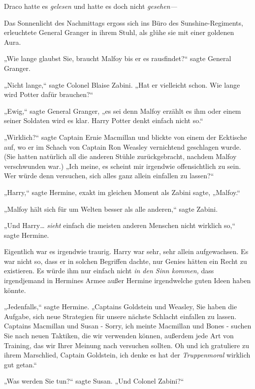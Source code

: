{Draco hatte es \emph{gelesen} und hatte es doch nicht \emph{gesehen—}

\later

Das Sonnenlicht des Nachmittags ergoss sich ins Büro des Sunshine-Regiments, erleuchtete General Granger in ihrem Stuhl, als glühe sie mit einer goldenen Aura.

„Wie lange glaubst Sie, braucht Malfoy bis er es rausfindet?“ sagte General Granger.

„Nicht lange,“ sagte Colonel Blaise Zabini. „Hat er vielleicht schon. Wie lange wird Potter dafür brauchen?“

„Ewig,“ sagte General Granger, „es sei denn Malfoy erzählt es ihm oder einem seiner Soldaten wird es klar. Harry Potter denkt einfach nicht so.“

„Wirklich?“ sagte Captain Ernie Macmillan und blickte von einem der Ecktische auf, wo er im Schach von Captain Ron Weasley vernichtend geschlagen wurde. (Sie hatten natürlich all die anderen Stühle zurückgebracht, nachdem Malfoy verschwunden war.) „Ich meine, es scheint mir irgendwie offensichtlich zu sein. Wer würde denn versuchen, sich alles ganz allein einfallen zu lassen?“

„Harry,“ sagte Hermine, exakt im gleichen Moment als Zabini sagte, „Malfoy.“

„Malfoy hält sich für um Welten besser als alle anderen,“ sagte Zabini.

„Und Harry… \emph{sieht} einfach die meisten anderen Menschen nicht wirklich so,“ sagte Hermine.

Eigentlich war es irgendwie traurig. Harry war sehr, sehr allein aufgewachsen. Es war nicht so, dass er in solchen Begriffen dachte, nur Genies hätten ein Recht zu existieren. Es würde ihm nur einfach nicht \emph{in den Sinn kommen,} dass irgendjemand in Hermines Armee außer Hermine irgendwelche guten Ideen haben könnte.

„Jedenfalls,“ sagte Hermine. „Captains Goldstein und Weasley, Sie haben die Aufgabe, sich neue Strategien für unsere nächste Schlacht einfallen zu lassen. Captains Macmillan und Susan - Sorry, ich meinte Macmillan und Bones - suchen Sie nach neuen Taktiken, die wir verwenden können, außerdem jede Art von Training, das wir Ihrer Meinung nach versuchen sollten. Oh und ich gratuliere zu ihrem Marschlied, Captain Goldstein, ich denke es hat der \emph{Truppenmoral} wirklich gut getan.“

„Was werden Sie tun?“ sagte Susan. „Und Colonel Zabini?“

}

